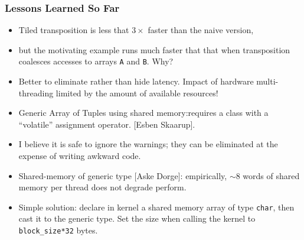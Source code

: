 \documentclass{beamer}
\newcommand{\emp}[1]{\textcolor{DikuRed}{ #1}}
\begin{document}
\begin{frame}[fragile,t]
  \frametitle{Lessons Learned So Far} 

\begin{itemize}
    \item Tiled transposition is less that $3\times$ faster
            than the naive version,
    \item but the motivating example runs much faster that that %
            when transposition coalesces accesses to arrays 
            {\tt A} and {\tt B}. \alert{Why?}\pause
    \item \emp{Better to eliminate rather than hide latency.}
            Impact of hardware multi-threading limited  
            by the amount of available resources!\bigskip

    \item Generic Array of Tuples using shared memory:\pause requires a class
            with a ``volatile'' assignment operator. [Esben Skaarup]. 
    \item I believe it is safe to ignore the warnings; they can be
            eliminated at the expense of writing awkward code.\bigskip

    \item Shared-memory of generic type [Aske Dorge]:\pause
            empirically, $\sim8$ words of shared memory per 
            thread does not degrade perform.
    \item Simple solution: declare in kernel a shared memory
            array of type {\tt char}, then cast it to the generic type. 
            Set the size when calling the kernel to {\tt block\_size*32} bytes.
\end  {itemize}

\end{frame}
\end{document}
